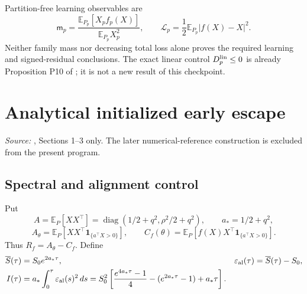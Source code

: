 \documentclass[11pt]{article}
\numberwithin{equation}{section}
\theoremstyle{definition}
\theoremstyle{remark}
\newcommand{\E}{\mathbb E}
\newcommand{\1}{\mathbf 1}
\newcommand{\dd}{\,d}
\DeclareMathOperator{\diag}{diag}
\newcommand{\source}[1]{\par\noindent\textit{Source:} #1\par\smallskip}
\begin{document}
Partition-free learning observables are
\begin{equation}\label{pa:learning}
 \mathsf m_p=\frac{\E_{P_p}[X_pf_p(X)]}{\E_{P_p}X_p^2},\qquad
 \mathcal L_p=\frac12\E_{P_p}|f(X)-X|^2.
\end{equation}
Neither family mass nor decreasing total loss alone proves the required
learning and signed-residual conclusions. The exact linear control
$D_p^{\rm lin}\le0$ is already Proposition P10 of \cite{F}; it is not a new
result of this checkpoint.

\section{Analytical initialized early escape}\label{pa:escape}
\source{\cite{E}, Sections 1--3 only. The later numerical-reference construction
is excluded from the present program.}

\subsection{Spectral and alignment control}
Put
\[
 A=\E_P[XX^\top]=\diag(1/2+q^2,\rho^2/2+q^2),\qquad a_*=1/2+q^2,
\]
\[
 A_\theta=\E_P[XX^\top\1_{\{a^\top X>0\}}],\qquad
 C_f(\theta)=\E_P[f(X)X^\top\1_{\{a^\top X>0\}}].
\]
Thus $R_f=A_\theta-C_f$. Define
\begin{align}
 \overline S(\tau)&=S_0e^{2a_*\tau},&
 \varepsilon_{\rm al}(\tau)&=\overline S(\tau)-S_0,\label{pa:earlyenvelopes}\\
 I(\tau)&=a_*\int_0^\tau\varepsilon_{\rm al}(s)^2\dd s
 =S_0^2\left[\frac{e^{4a_*\tau}-1}{4}
 -(e^{2a_*\tau}-1)+a_*\tau\right].\nonumber
\end{align}
\end{document}
